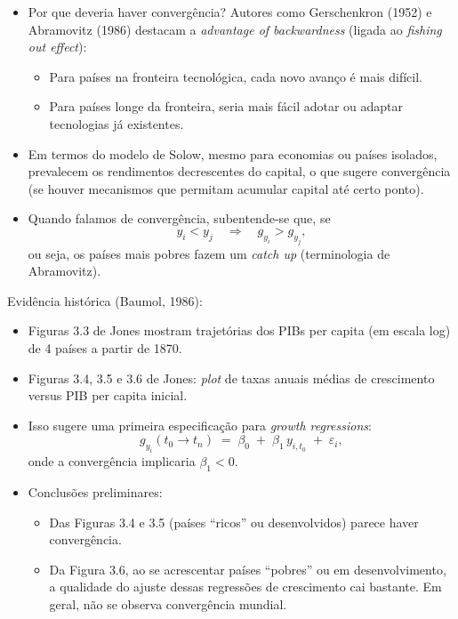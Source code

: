 \documentclass[a4paper,12pt]{article}[abntex2]
\begin{document}
\begin{itemize}
    \item Por que deveria haver convergência? Autores como Gerschenkron (1952) 
    e Abramovitz (1986) destacam a \emph{advantage of backwardness} 
    (ligada ao \emph{fishing out effect}): 
    \begin{itemize}
        \item Para países na fronteira tecnológica, cada novo avanço é mais difícil.
        \item Para países longe da fronteira, seria mais fácil adotar ou adaptar 
              tecnologias já existentes.
    \end{itemize}
    \item Em termos do modelo de Solow, mesmo para economias ou países isolados, 
    prevalecem os rendimentos decrescentes do capital, o que sugere convergência 
    (se houver mecanismos que permitam acumular capital até certo ponto).
    \item Quando falamos de convergência, subentende-se que, se 
    \[
      y_i < y_j \quad \Longrightarrow \quad g_{y_i} > g_{y_j},
    \]
    ou seja, os países mais pobres fazem um \emph{catch up} (terminologia de Abramovitz).
\end{itemize}

Evidência histórica (Baumol, 1986):
\begin{itemize}
    \item Figuras 3.3 de Jones mostram trajetórias dos PIBs per capita 
    (em escala log) de 4 países a partir de 1870.
    \item Figuras 3.4, 3.5 e 3.6 de Jones: \emph{plot} de taxas anuais médias de 
    crescimento versus PIB per capita inicial.
    \item Isso sugere uma primeira especificação para \emph{growth regressions}:
    \[
      g_{y_i}(t_0 \to t_n) \;=\; \beta_0 \;+\; \beta_1 \, y_{i,t_0} \;+\; \varepsilon_i,
    \]
    onde a convergência implicaria \(\beta_1 < 0\).
    \item Conclusões preliminares:
    \begin{itemize}
        \item Das Figuras 3.4 e 3.5 (países ``ricos'' ou desenvolvidos) 
              parece haver convergência.
        \item Da Figura 3.6, ao se acrescentar países ``pobres'' ou em desenvolvimento, 
              a qualidade do ajuste dessas regressões de crescimento cai bastante. 
              Em geral, não se observa convergência mundial.
    \end{itemize}
\end{itemize}
\end{document}
